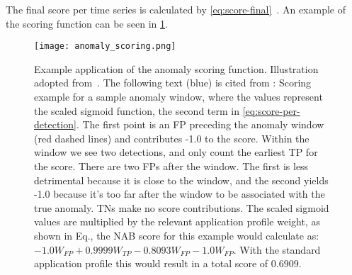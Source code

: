 The final score per time series is calculated by \cref{eq:score-final}~\cite[cf][]{Lavin.2015}.
An example of the scoring function can be seen in \cref{fig:anomaly-score-example}.

\begin{figure}[htp!]
    \centering
    \texttt{[image: anomaly\_scoring.png]}
    \caption[Example of the anomaly scoring function]{Example application of the anomaly
    scoring function. Illustration adopted from~\cite{Lavin.2015}. The following
    text (blue) is cited from \textcite{Lavin.2015}:
    {\color{blue}
    Scoring example for a sample anomaly window, where the values
    represent the scaled sigmoid function, the second term in \cref{eq:score-per-detection}.
    The first point is an FP preceding the anomaly window (red dashed lines) and
    contributes -1.0 to the score. Within the window we see two detections, and
    only count the earliest TP for the score. There are two FPs after the window.
    The first is less detrimental because it is close to the window, and the second
    yields -1.0 because it’s too far after the window to be associated with the true
    anomaly. TNs make no score contributions. The scaled sigmoid values are
    multiplied by the relevant application profile weight, as shown in Eq.,
    the NAB score for this example would calculate as: 
    \(-1.0W_{FP} + 0.9999W_{TP} - 0.8093W_{FP} - 1.0W_{FP}\).
    With the standard application profile this would result in a total score of
    \(0.6909\).}
    }\label{fig:anomaly-score-example}
\end{figure}\clearpage

